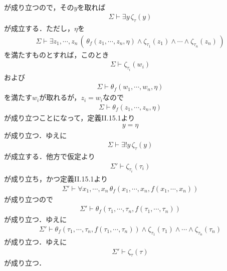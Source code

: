 \documentclass[a4j,10.5pt,oneside,openany]{jsbook}
\theoremstyle{mystyle}
\begin{document}
\begin{description}
\begin{align}
			\end{align}
			が成り立つので，その$y$を取れば
			\begin{align}
				\Sigma \vdash \exists y\, \zeta_{\tau}(y)
			\end{align}
			が成立する．ただし，$\eta$を
			\begin{align}
				\Sigma \vdash \exists z_{1}, \cdots, z_{n}\, \left(\, 
				\theta_{f}(z_{1},\cdots,z_{n},\eta) \wedge \zeta_{\tau_{1}}(z_{1}) \wedge
				\cdots \wedge \zeta_{\tau_{n}}(z_{n})\, \right)
			\end{align}
			を満たすものとすれば，このとき
			\begin{align}
				\Sigma \vdash \zeta_{\tau_{i}}(w_{i})
			\end{align}
			および
			\begin{align}
				\Sigma \vdash \theta_{f}(w_{1},\cdots,w_{n},\eta)
			\end{align}
			を満たす$w_{i}$が取れるが，$z_{i} = w_{i}$なので
			\begin{align}
				\Sigma \vdash \theta_{f}(z_{1},\cdots,z_{n},\eta)
			\end{align}
			が成り立つことになって，定義I\hspace{-.1em}I.15.1より
			\begin{align}
				y = \eta
			\end{align}
			が成り立つ．ゆえに
			\begin{align}
				\Sigma \vdash \exists! y\, \zeta_{\tau}(y)
			\end{align}
			が成立する．他方で仮定より
			\begin{align}
				\Sigma' \vdash \zeta_{\tau_{i}}(\tau_{i})
			\end{align}
			が成り立ち，かつ定義I\hspace{-.1em}I.15.1より
			\begin{align}
				\Sigma' \vdash \forall x_{1},\cdots,x_{n}\,
				\theta_{f}(x_{1},\cdots,x_{n},f(x_{1},\cdots,x_{n}))
			\end{align}
			が成り立つので
			\begin{align}
				\Sigma' \vdash \theta_{f}(\tau_{1},\cdots,\tau_{n},f(\tau_{1},\cdots,\tau_{n}))
			\end{align}
			が成り立つ．ゆえに
			\begin{align}
				\Sigma' \vdash \theta_{f}(\tau_{1},\cdots,\tau_{n},f(\tau_{1},\cdots,\tau_{n})) \wedge \zeta_{\tau_{1}}(\tau_{1}) \wedge \cdots \wedge \zeta_{\tau_{n}}(\tau_{n})
			\end{align}
			が成り立つ．ゆえに
			\begin{align}
				\Sigma' \vdash \zeta_{\tau}(\tau)
			\end{align}
			が成り立つ．
			

\end{description}
\end{document}
